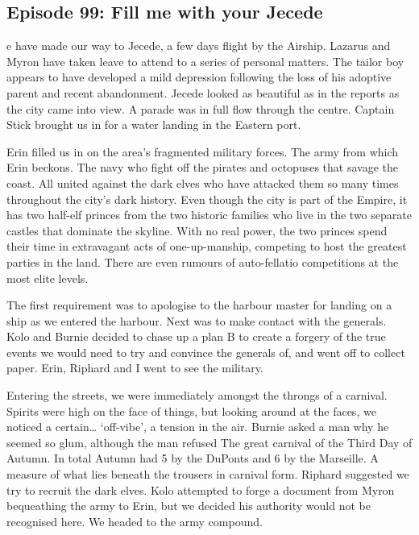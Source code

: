 \subsection{Episode 99: Fill me with your Jecede}

e have made our way to Jecede, a few days flight by the Airship. Lazarus and Myron have taken leave to attend to a series of personal matters. The tailor boy appears to have developed a mild depression following the loss of his adoptive parent and recent abandonment. Jecede looked as beautiful as in the reports as the city came into view. A parade was in full flow through the centre. Captain Stick brought us in for a water landing in the Eastern port.\medskip

Erin filled us in on the area’s fragmented military forces. The army from which Erin beckons. The navy who fight off the pirates and octopuses that savage the coast. All united against the dark elves who have attacked them so many times throughout the city’s dark history. Even though the city is part of the Empire, it has two half-elf princes from the two historic families who live in the two separate castles that dominate the skyline. With no real power, the two princes spend their time in extravagant acts of one-up-manship, competing to host the greatest parties in the land. There are even rumours of auto-fellatio competitions at the most elite levels.\medskip

The first requirement was to apologise to the harbour master for landing on a ship as we entered the harbour. Next was to make contact with the generals. Kolo and Burnie decided to chase up a plan B to create a forgery of the true events we would need to try and convince the generals of, and went off to collect paper. Erin, Riphard and I went to see the military.\medskip

Entering the streets, we were immediately amongst the throngs of a carnival. Spirits were high on the face of things, but looking around at the faces, we noticed a certain… ‘off-vibe’, a tension in the air. Burnie asked a man why he seemed so glum, although the man refused The great carnival of the Third Day of Autumn. In total Autumn had 5 by the DuPonts and 6 by the Marseille. A measure of what lies beneath the trousers in carnival form. Riphard suggested we try to recruit the dark elves. Kolo attempted to forge a document from Myron bequeathing the army to Erin, but we decided his authority would not be recognised here. We headed to the army compound.\medskip

